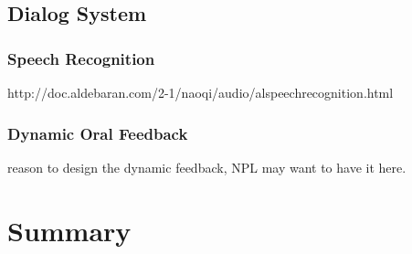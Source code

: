 \subsection{Dialog System}

\subsubsection{Speech Recognition}
http://doc.aldebaran.com/2-1/naoqi/audio/alspeechrecognition.html

\subsubsection{Dynamic Oral Feedback}
reason to design the dynamic feedback, NPL may want to have it here. 



\section{Summary}

